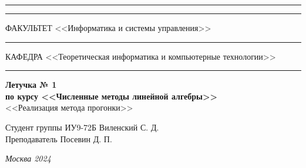 \documentclass[a4paper, 14pt]{extarticle}
\begin{document}
\begin{titlepage}
\vspace{-25pt}
\hspace{-35pt}\rule{\textwidth}{2.3pt}

\vspace*{-20.3pt}
\hspace{-35pt}\rule{\textwidth}{0.4pt}

\vspace{1.5ex}
\hspace{-35pt} \noindent \small ФАКУЛЬТЕТ\hspace{80pt} <<Информатика и системы управления>>

\vspace*{-16pt}
\hspace{47pt}\rule{0.83\textwidth}{0.4pt}

\vspace{0.5ex}
\hspace{-35pt} \noindent \small КАФЕДРА\hspace{50pt} <<Теоретическая информатика и компьютерные технологии>>

\vspace*{-16pt}
\hspace{30pt}\rule{0.866\textwidth}{0.4pt}
  
\vspace{11em}

\begin{center}
\Large {\bf Летучка № 1} \\ 
\large {\bf по курсу <<Численные методы линейной алгебры>>} \\
\large <<Реализация метода прогонки>> 
\end{center}\normalsize

\vspace{8em}


\begin{flushright}
  {Студент группы ИУ9-72Б Виленский С. Д. \hspace*{15pt}\\ 
  \vspace{2ex}
  Преподаватель Посевин Д. П.\hspace*{15pt}}
\end{flushright}

\bigskip

\vfill
 

\begin{center}
\textsl{Москва 2024}
\end{center}
\end{titlepage}
\end{document}
